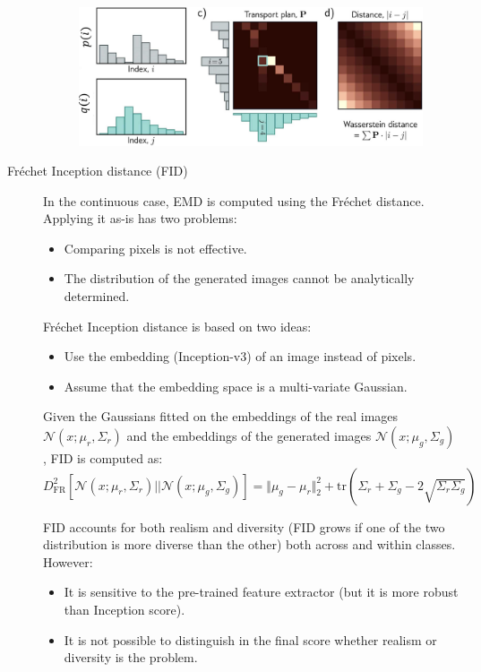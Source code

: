 \begin{description}
        \begin{figure}[H]
            \centering
            \includegraphics[width=0.6\linewidth]{./img/earth_mover_plan.jpg}
        \end{figure}


    \item[Fréchet Inception distance (FID)] 
        \begin{remark}
            In the continuous case, EMD is computed using the Fréchet distance. Applying it as-is has two problems:
            \begin{itemize}
                \item Comparing pixels is not effective.
                \item The distribution of the generated images cannot be analytically determined.
            \end{itemize} 
        \end{remark}

        Fréchet Inception distance is based on two ideas:
        \begin{itemize}
            \item Use the embedding (Inception-v3) of an image instead of pixels.
            \item Assume that the embedding space is a multi-variate Gaussian.
        \end{itemize}
        Given the Gaussians fitted on the embeddings of the real images $\mathcal{N}(x; \mu_r, \Sigma_r)$ and the embeddings of the generated images $\mathcal{N}(x; \mu_g, \Sigma_g)$, FID is computed as:
        \[ 
            D_\text{FR}^2\left[ \mathcal{N}(x; \mu_r, \Sigma_r) || \mathcal{N}(x; \mu_g, \Sigma_g) \right] = \Vert \mu_g - \mu_r \Vert^2_2 + \text{tr}\left( \Sigma_r + \Sigma_g - 2\sqrt{\Sigma_r \Sigma_g} \right)
        \]
    
    \begin{remark}
        FID accounts for both realism and diversity (FID grows if one of the two distribution is more diverse than the other) both across and within classes. However:
        \begin{itemize}
            \item It is sensitive to the pre-trained feature extractor (but it is more robust than Inception score).
            \item It is not possible to distinguish in the final score whether realism or diversity is the problem.
        \end{itemize}
    \end{remark}
\end{description}



